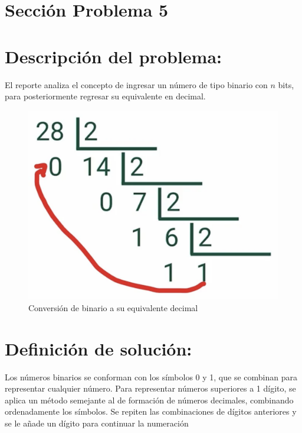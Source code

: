 \documentclass{IEEEcsmag}
\begin{document}
\section{Sección Problema 5}
\section*{Descripción del problema:}
El reporte analiza el concepto de ingresar un número de tipo binario con $n$ bits, para posteriormente regresar su equivalente en decimal.

\begin{figure}[h!]
    \centering
    \includegraphics[width = 6 cm]{LaTeX/latex-imagenes/conversionbin.png}
    \caption{Conversión de binario a su equivalente decimal}
    \label{fig:GraficaEcuacionRecta}
\end{figure}

\section*{Definición de solución:}

Los números binarios se conforman con los símbolos 0 y 1, que se combinan para representar cualquier número. 
Para representar números superiores a 1 dígito, se aplica un método semejante al de formación de números decimales, combinando ordenadamente los símbolos. Se repiten las combinaciones de dígitos anteriores y se le añade un dígito para continuar la numeración
\end{document}
